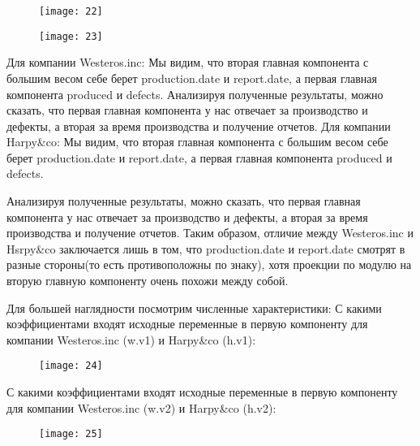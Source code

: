 \documentclass{beamer}
\begin{document}
\begin{frame}
\begin{figure}[t]
	\centering
	\texttt{[image: 22]}
\end{figure}
\end{frame}

\begin{frame}
\begin{figure}[t]
	\centering
	\texttt{[image: 23]}
\end{figure}
\end{frame}

\begin{frame}
Для компании Westeros.inc:
Мы видим, что вторая главная компонента с большим весом себе берет production.date и report.date, а первая главная компонента produced и defects. 
Анализируя полученные результаты, можно сказать, что первая главная компонента у нас отвечает за производство и дефекты, а вторая за время производства и получение отчетов.
Для компании Harpy\&co:
Мы видим, что вторая главная компонента с большим весом себе берет production.date и report.date, а первая главная компонента produced и defects.
\end{frame}

\begin{frame}
Анализируя полученные результаты, можно сказать, что первая главная компонента у нас отвечает за производство и дефекты, а вторая за время производства и получение отчетов.  
Таким образом, отличие между Westeros.inc и Hsrpy\&co заключается лишь в том, что production.date и report.date смотрят в разные стороны(то есть противоположны по знаку), хотя проекции по модулю на вторую главную компоненту очень похожи между собой.
\end{frame}

\begin{frame}
Для большей наглядности посмотрим численные характеристики:
С какими коэффициентами входят исходные переменные в первую компоненту для компании Westeros.inc (w.v1) и Harpy\&co (h.v1):
\begin{figure}[t]
	\centering
	\texttt{[image: 24]}
\end{figure}
\end{frame}

\begin{frame}
С какими коэффициентами входят исходные переменные в первую компоненту для компании Westeros.inc (w.v2) и Harpy\&co (h.v2):
\begin{figure}[t]
	\centering
	\texttt{[image: 25]}
\end{figure}
\end{frame}
\end{document}
